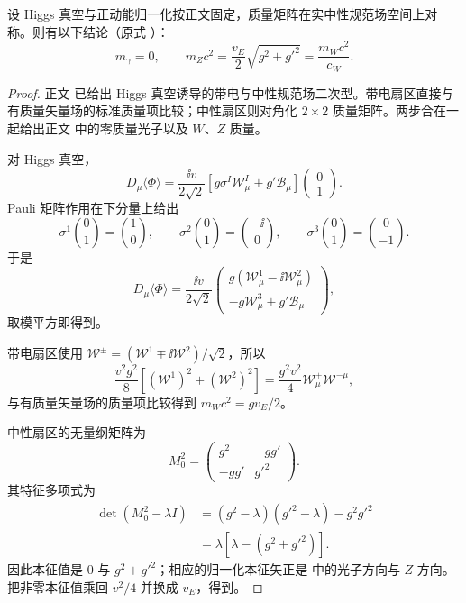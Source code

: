\begin{proposition}[正半定中性质量矩阵的分解]
设 Higgs 真空与正动能归一化按正文固定，质量矩阵在实中性规范场空间上对称。则有以下结论（原式 ）：
\begin{equation*}
 \boxed{
 m_\gamma=0,
 \qquad
 m_Zc^2=\frac{v_E}{2}\sqrt{g^2+g'^2}
 =\frac{m_Wc^2}{c_W}.}
\end{equation*}
\end{proposition}
\begin{proof}
正文 已给出 Higgs 真空诱导的带电与中性规范场二次型。带电扇区直接与有质量矢量场的标准质量项比较；中性扇区则对角化 $2\times2$ 质量矩阵。两步合在一起给出正文 中的零质量光子以及 $W$、$Z$ 质量。

对 Higgs 真空，
\begin{equation*}
 D_\mu\langle\Phi\rangle
 =\frac{\ii v}{2\sqrt2}
 \left[g\sigma^I\mathcal W_\mu^I+g'\mathcal B_\mu\right]
 \begin{pmatrix}0\\1\end{pmatrix}.
\end{equation*}
Pauli 矩阵作用在下分量上给出
\begin{equation*}
 \sigma^1\binom01=\binom10,
 \qquad
 \sigma^2\binom01=\binom{-\ii}0,
 \qquad
 \sigma^3\binom01=\binom0{-1}.
\end{equation*}
于是
\begin{equation*}
 D_\mu\langle\Phi\rangle
 =\frac{\ii v}{2\sqrt2}
 \begin{pmatrix}
 g(\mathcal W_\mu^1-\ii\mathcal W_\mu^2)\\
 -g\mathcal W_\mu^3+g'\mathcal B_\mu
 \end{pmatrix},
\end{equation*}
取模平方即得到。

带电扇区使用 $\mathcal W^\pm=(\mathcal W^1\mp\ii\mathcal W^2)/\sqrt2$，所以
\begin{equation*}
 \frac{v^2g^2}{8}\left[(\mathcal W^1)^2+(\mathcal W^2)^2\right]
 =\frac{g^2v^2}{4}\mathcal W^+_\mu\mathcal W^{-\mu},
\end{equation*}
与有质量矢量场的质量项比较得到 $m_Wc^2=gv_E/2$。

中性扇区的无量纲矩阵为
\begin{equation*}
 M_0^2=\begin{pmatrix}g^2&-gg'\\-gg'&g'^2\end{pmatrix}.
\end{equation*}
其特征多项式为
\begin{align*}
 \det(M_0^2-\lambda I)
 &=(g^2-\lambda)(g'^2-\lambda)-g^2g'^2\\
 &=\lambda\left[\lambda-(g^2+g'^2)\right].
\end{align*}
因此本征值是 $0$ 与 $g^2+g'^2$；相应的归一化本征矢正是 中的光子方向与 $Z$ 方向。把非零本征值乘回 $v^2/4$ 并换成 $v_E$，得到。
\end{proof}


